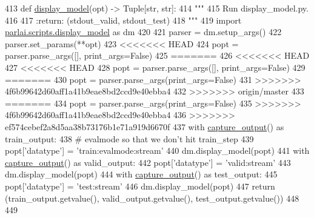 \begin{DoxyCode}
413 \textcolor{keyword}{def }\hyperlink{namespaceparlai_1_1utils_1_1testing_a1b41200277931b2e4e684dc9452889a9}{display\_model}(opt) -> Tuple[str, str]:
414     \textcolor{stringliteral}{"""}
415 \textcolor{stringliteral}{    Run display\_model.py.}
416 \textcolor{stringliteral}{}
417 \textcolor{stringliteral}{    :return: (stdout\_valid, stdout\_test)}
418 \textcolor{stringliteral}{    """}
419     \textcolor{keyword}{import} \hyperlink{namespaceparlai_1_1scripts_1_1display__model}{parlai.scripts.display\_model} \textcolor{keyword}{as} dm
420 
421     parser = dm.setup\_args()
422     parser.set\_params(**opt)
423 <<<<<<< HEAD
424     popt = parser.parse\_args([], print\_args=\textcolor{keyword}{False})
425 =======
426 <<<<<<< HEAD
427 <<<<<<< HEAD
428     popt = parser.parse\_args([], print\_args=\textcolor{keyword}{False})
429 =======
430     popt = parser.parse\_args(print\_args=\textcolor{keyword}{False})
431 >>>>>>> 4f6b99642d60aff1a41b9eae8bd2ccd9e40ebba4
432 >>>>>>> origin/master
433 =======
434     popt = parser.parse\_args(print\_args=\textcolor{keyword}{False})
435 >>>>>>> 4f6b99642d60aff1a41b9eae8bd2ccd9e40ebba4
436 >>>>>>> ef574cebef2a8d5aa38b73176b1e71a919d6670f
437     with \hyperlink{namespaceparlai_1_1utils_1_1testing_ab00d4d693202afab92c06387aa50699b}{capture\_output}() \textcolor{keyword}{as} train\_output:
438         \textcolor{comment}{# evalmode so that we don't hit train\_step}
439         popt[\textcolor{stringliteral}{'datatype'}] = \textcolor{stringliteral}{'train:evalmode:stream'}
440         dm.display\_model(popt)
441     with \hyperlink{namespaceparlai_1_1utils_1_1testing_ab00d4d693202afab92c06387aa50699b}{capture\_output}() \textcolor{keyword}{as} valid\_output:
442         popt[\textcolor{stringliteral}{'datatype'}] = \textcolor{stringliteral}{'valid:stream'}
443         dm.display\_model(popt)
444     with \hyperlink{namespaceparlai_1_1utils_1_1testing_ab00d4d693202afab92c06387aa50699b}{capture\_output}() \textcolor{keyword}{as} test\_output:
445         popt[\textcolor{stringliteral}{'datatype'}] = \textcolor{stringliteral}{'test:stream'}
446         dm.display\_model(popt)
447     \textcolor{keywordflow}{return} (train\_output.getvalue(), valid\_output.getvalue(), test\_output.getvalue())
448 
449 
\end{DoxyCode}
\mbox{\label{namespaceparlai_1_1utils_1_1testing_ae0c93fc8f4c3e079333dba0065fa4dd2}} 

